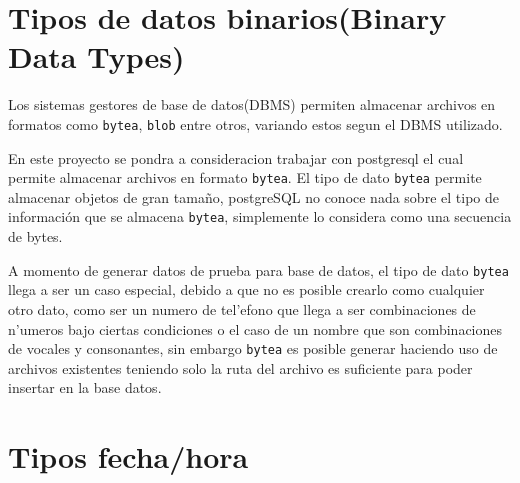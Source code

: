\section{Tipos de datos binarios(Binary Data Types)}

Los sistemas gestores de base de datos(DBMS) permiten almacenar archivos en formatos como \texttt{bytea}, \texttt{blob} entre otros, variando estos segun el DBMS utilizado. 

En este proyecto se pondra a consideracion trabajar con postgresql el cual permite almacenar archivos en formato \texttt{bytea}. El tipo de dato \texttt{bytea} permite almacenar objetos de gran tama\~no, postgreSQL no conoce nada sobre el tipo de informaci\'on que se almacena \texttt{bytea}, simplemente lo considera como una secuencia de bytes.

A momento de generar datos de prueba para base de datos, el tipo de dato \texttt{bytea} llega a ser un caso especial, debido a que no es posible crearlo como cualquier otro dato, como ser un numero de tel'efono que llega a ser combinaciones de n'umeros bajo ciertas condiciones o el caso de un nombre que son combinaciones de vocales y consonantes, sin embargo \texttt{bytea} es posible generar haciendo uso de archivos existentes teniendo solo la ruta del archivo es suficiente para poder insertar en la base datos.
\section{Tipos fecha/hora}
